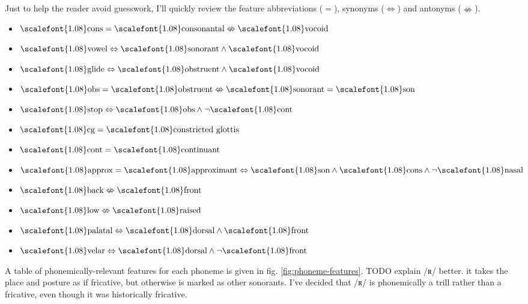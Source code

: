\documentclass[12pt]{book} %
\newcommand{\mathipa}[1]{\textrm{\scalefont{1.08}\selectfont #1}} %
\begin{document}
Just to help the reader avoid guesswork, I'll quickly review the feature abbreviations ($=$), synonyms ($\Leftrightarrow$) and antonyms ($\nLeftrightarrow$).
\begin{multicols}{2}
\begin{itemize}
\item $\mathipa{cons} = \mathipa{consonantal} \nLeftrightarrow \mathipa{vocoid}$
\item $\mathipa{vowel} \Leftrightarrow \mathipa{sonorant} \land \mathipa{vocoid}$
\item $\mathipa{glide} \Leftrightarrow \mathipa{obstruent} \land \mathipa{vocoid}$
\item $\mathipa{obs} = \mathipa{obstruent} \nLeftrightarrow \mathipa{sonorant} = \mathipa{son}$
\item $\mathipa{stop} \Leftrightarrow \mathipa{obs} \land \lnot\mathipa{cont}$
\item $\mathipa{cg} = \mathipa{constricted glottis}$
\item $\mathipa{cont} = \mathipa{continuant}$
\item $\mathipa{approx} = \mathipa{approximant} \Leftrightarrow \mathipa{son} \land \mathipa{cons} \land \lnot\mathipa{nasal}$
\item $\mathipa{back} \nLeftrightarrow \mathipa{front}$
\item $\mathipa{low} \nLeftrightarrow \mathipa{raised}$
\item $\mathipa{palatal} \Leftrightarrow \mathipa{dorsal} \land \mathipa{front}$
\item $\mathipa{velar} \Leftrightarrow \mathipa{dorsal} \land \lnot\mathipa{front}$
\end{itemize}
\end{multicols}

A table of phonemically-relevant features for each phoneme is given in fig. \ref{fig:phoneme-features}.
TODO explain /ʀ/ better.
it takes the place and posture as if fricative, but otherwise is marked  as other sonorants.
I've decided that /ʀ/ is phonemically a trill rather than a fricative, even though it was historically fricative.
\end{document}
